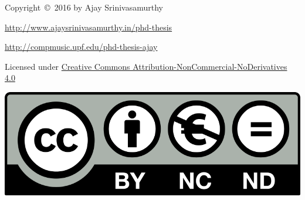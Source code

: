 \thispagestyle{empty}

\noindent Copyright~\copyright~2016 by Ajay Srinivasamurthy

\vspace{2em}
\noindent \url{http://www.ajaysrinivasamurthy.in/phd-thesis}

\vspace{0.5em}
\noindent \url{http://compmusic.upf.edu/phd-thesis-ajay}

\vspace{2em}
\noindent Licensed under \href{http://creativecommons.org/licenses/by-nc-nd/4.0/}{Creative Commons Attribution-NonCommercial-NoDerivatives 4.0}

\vspace{1em}
\noindent \href{http://creativecommons.org/licenses/by-nc-nd/4.0/}{\includegraphics[scale=0.12]{figs/creative-commons.png}}

\vfill

